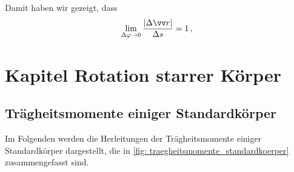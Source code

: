 Damit haben wir gezeigt, dass 
\begin{equation}\label{eq: sehnenlänge_gleich_bogenlänge}
    \lim_{\Delta \varphi \to 0} \frac{|\Delta \ivec{r}|}{\Delta s} = 1 \mComma
\end{equation}

\section{Kapitel Rotation starrer Körper}\label{sec: herleitungen_rotation_starrer_koerper}
\subsection{Trägheitsmomente einiger Standardkörper}\label{sec: App_Herleitungen_Traegheitsmomente}
Im Folgenden werden die Herleitungen der Trägheitsmomente einiger Standardkörper dargestellt, die in \cref{fig: traegheitsmomente_standardkoerper} zusammengefasst sind.

